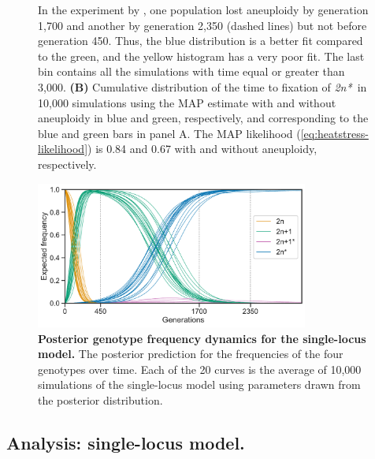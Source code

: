 \documentclass[12pt]{extarticle}
\newcommand{\eumt}{\emph{2n*}}
\begin{document}
\begin{figure}[h!]
{In the experiment by \citet{Yona2012}, one population lost aneuploidy by generation 1,700 and another by generation 2,350 (dashed lines) but not before generation 450. Thus, the blue distribution is a better fit compared to the green, and the yellow histogram has a very poor fit.
The last bin contains all the simulations with time equal or greater than 3,000.
    \textbf{(B)}
	Cumulative distribution of the time to fixation of \eumt\ in 10,000 simulations using the MAP estimate with and without aneuploidy in blue and green, respectively, and corresponding to the blue and green bars in panel A. The MAP likelihood (\cref{eq:heatstress-likelihood}) is 0.84 and 0.67 with and without aneuploidy, respectively.
     }
  \label{fig:2n*-fixation}
\end{figure}

\begin{figure}[h!]
  \centering
\includegraphics[width=0.8\textwidth]{../figures/dynamics.pdf}
  \caption{
  \textbf{Posterior genotype frequency dynamics for the single-locus model.} 
  The posterior prediction for the frequencies of the four genotypes over time. Each of the 20 curves is the average of 10,000 simulations of the single-locus model using parameters drawn from the posterior distribution.
  }
  \label{fig:ppc-plot}
\end{figure}

\pagebreak
\subsection*{Analysis: single-locus model.}
\end{document}
